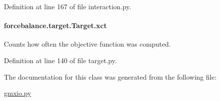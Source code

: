 Definition at line 167 of file interaction.\-py.

\hypertarget{classforcebalance_1_1target_1_1Target_aad2e385cfbf7b4a68f1c2cb41133fe82}{
\paragraph[{xct}]{\setlength{\rightskip}{0pt plus 5cm}forcebalance.\-target.\-Target.\-xct\hspace{0.3cm}{\ttfamily [inherited]}}}\label{classforcebalance_1_1target_1_1Target_aad2e385cfbf7b4a68f1c2cb41133fe82}


Counts how often the objective function was computed. 



Definition at line 140 of file target.\-py.



The documentation for this class was generated from the following file\-:\begin{DoxyCompactItemize}
\item 
\hyperlink{gmxio_8py}{gmxio.\-py}\end{DoxyCompactItemize}
